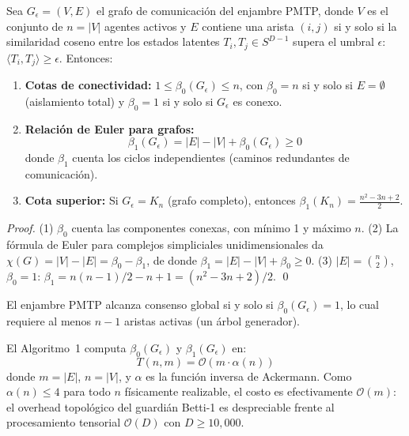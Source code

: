 \begin{lemma}
\label{lem:betti_bounds}
Sea $G_\epsilon = (V, E)$ el grafo de comunicación del enjambre PMTP, donde
$V$ es el conjunto de $n = |V|$ agentes activos y $E$ contiene una arista
$(i, j)$ si y solo si la similaridad coseno entre los estados latentes
$T_i, T_j \in S^{D-1}$ supera el umbral $\epsilon$:
$\langle T_i, T_j \rangle \geq \epsilon$. Entonces:
\begin{enumerate}
    \item \textbf{Cotas de conectividad:} 
    $1 \leq \beta_0(G_\epsilon) \leq n$, con $\beta_0 = n$ si y solo si 
    $E = \emptyset$ (aislamiento total) y $\beta_0 = 1$ si y solo si 
    $G_\epsilon$ es conexo.
    
    \item \textbf{Relación de Euler para grafos:}
    \begin{equation}
    \beta_1(G_\epsilon) = |E| - |V| + \beta_0(G_\epsilon) \geq 0
    \end{equation}
    donde $\beta_1$ cuenta los ciclos independientes (caminos 
    redundantes de comunicación).
    
    \item \textbf{Cota superior:} Si $G_\epsilon = K_n$ 
    (grafo completo), entonces 
    $\beta_1(K_n) = \frac{n^2 - 3n + 2}{2}$.
\end{enumerate}
\end{lemma}

\begin{proof}
(1) $\beta_0$ cuenta las componentes conexas, con mínimo 1 y máximo $n$.
(2) La fórmula de Euler para complejos simpliciales unidimensionales da 
$\chi(G) = |V| - |E| = \beta_0 - \beta_1$, de donde 
$\beta_1 = |E| - |V| + \beta_0 \geq 0$.
(3) $|E| = \binom{n}{2}$, $\beta_0 = 1$:
$\beta_1 = n(n-1)/2 - n + 1 = (n^2 - 3n + 2)/2$. \qed
\end{proof}

\begin{corollary}
\label{cor:consensus}
El enjambre PMTP alcanza consenso global si y solo si 
$\beta_0(G_\epsilon) = 1$, lo cual requiere al menos $n - 1$ aristas
activas (un árbol generador).
\end{corollary}

\begin{lemma}
\label{lem:unionfind_complexity}
El Algoritmo~1 computa $\beta_0(G_\epsilon)$ y $\beta_1(G_\epsilon)$ en:
\begin{equation}
T(n, m) = \mathcal{O}(m \cdot \alpha(n))
\end{equation}
donde $m = |E|$, $n = |V|$, y $\alpha$ es la función inversa de Ackermann.
Como $\alpha(n) \leq 4$ para todo $n$ físicamente realizable, el costo es
efectivamente $\mathcal{O}(m)$: el overhead topológico del guardián Betti-1 
es despreciable frente al procesamiento tensorial $\mathcal{O}(D)$ con 
$D \geq 10{,}000$.
\end{lemma}

